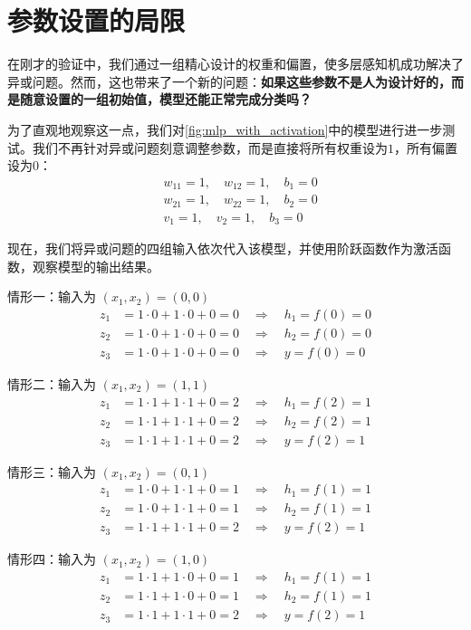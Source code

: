 \section{参数设置的局限}

在刚才的验证中，我们通过一组精心设计的权重和偏置，使多层感知机成功解决了异或问题。然而，这也带来了一个新的问题：\textbf{如果这些参数不是人为设计好的，而是随意设置的一组初始值，模型还能正常完成分类吗？}

为了直观地观察这一点，我们对\cref{fig:mlp_with_activation}中的模型进行进一步测试。我们不再针对异或问题刻意调整参数，而是直接将所有权重设为$1$，所有偏置设为$0$：
\begin{align*}
&w_{11}=1,\quad w_{12}=1,\quad b_1=0 \\
&w_{21}=1,\quad w_{22}=1,\quad b_2=0 \\
&v_1=1,\quad v_2=1,\quad b_3=0
\end{align*}

现在，我们将异或问题的四组输入依次代入该模型，并使用阶跃函数作为激活函数，观察模型的输出结果。

情形一：输入为 $(x_1,x_2)=(0,0)$
\begin{align*}
    z_1 &= 1\cdot0 + 1\cdot0 + 0 = 0 \quad\Rightarrow\quad h_1 = f(0) = 0 \\
    z_2 &= 1\cdot0 + 1\cdot0 + 0 = 0 \quad\Rightarrow\quad h_2 = f(0) = 0 \\
    z_3 &= 1\cdot0 + 1\cdot0 + 0 = 0 \quad\Rightarrow\quad y = f(0) = 0
\end{align*}

情形二：输入为 $(x_1,x_2)=(1,1)$
\begin{align*}
    z_1 &= 1\cdot1 + 1\cdot1 + 0 = 2 \quad\Rightarrow\quad h_1 = f(2) = 1 \\
    z_2 &= 1\cdot1 + 1\cdot1 + 0 = 2 \quad\Rightarrow\quad h_2 = f(2) = 1 \\
    z_3 &= 1\cdot1 + 1\cdot1 + 0 = 2 \quad\Rightarrow\quad y = f(2) = 1
\end{align*}

情形三：输入为 $(x_1,x_2)=(0,1)$
\begin{align*}
    z_1 &= 1\cdot0 + 1\cdot1 + 0 = 1 \quad\Rightarrow\quad h_1 = f(1) = 1 \\
    z_2 &= 1\cdot0 + 1\cdot1 + 0 = 1 \quad\Rightarrow\quad h_2 = f(1) = 1 \\
    z_3 &= 1\cdot1 + 1\cdot1 + 0 = 2 \quad\Rightarrow\quad y = f(2) = 1
\end{align*}

情形四：输入为 $(x_1,x_2)=(1,0)$
\begin{align*}
    z_1 &= 1\cdot1 + 1\cdot0 + 0 = 1 \quad\Rightarrow\quad h_1 = f(1) = 1 \\
    z_2 &= 1\cdot1 + 1\cdot0 + 0 = 1 \quad\Rightarrow\quad h_2 = f(1) = 1 \\
    z_3 &= 1\cdot1 + 1\cdot1 + 0 = 2 \quad\Rightarrow\quad y = f(2) = 1
\end{align*}

